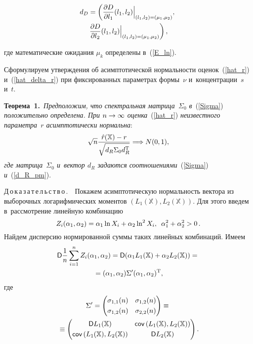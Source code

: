 \begin{multicols}{2}
\vspace*{-12pt}

\noindent
\begin{multline}
d_{D}=\left(\displaystyle\frac{\displaystyle \partial D\mathstrut}{\displaystyle \partial 
l_1\mathstrut}(l_1,l_2)\Big|_{(l_1,l_2)=(\mu_1,\mu_2)},\right.\\
\left.\displaystyle\frac{\displaystyle \partial D\mathstrut}{\displaystyle \partial l_2\mathstrut}(l_1,l_2)\Big|_{(l_1,l_2)=(\mu_1,\mu_2)}\right),
\label{d_D_pm}
\end{multline}

\columnbreak

\noindent
где математические ожидания $\mu_k$ определены\linebreak
 в~(\ref{E_ln}).

Сформулируем утверждения об асимптотической нор\-маль\-ности оценок~(\ref{hat_r}) и~(\ref{hat_delta_r})
 при фиксированных па\-ра\-мет\-рах формы~$\nu$ и~кон\-цент\-ра\-ции~$s$ и~$t$.

\smallskip

\noindent
\textbf{Теорема~1.}\
\textit{Предположим, что спект\-раль\-ная мат\-ри\-ца~$\Sigma_0$ в}~(\ref{Sigma}) \textit{положительно 
определена. При $n\hm\to\infty$ оцен\-ка}~(\ref{hat_r}) \textit{неизвестного па\-ра\-мет\-ра~$r$ 
асимп\-то\-ти\-чески нормальна}:
$$
\sqrt{n}\displaystyle\frac{\displaystyle {\hat r}(\mathbb{X})-r\mathstrut}{\displaystyle \sqrt{
d_{R}\Sigma_0 d_{R}^{\mathrm{T}}}\mathstrut}\Longrightarrow N(0,1),
$$
\textit{где мат\-ри\-ца~$\Sigma_0$ и~вектор $d_R$ задаются соотношениями}~(\ref{Sigma}) \textit{и}~(\ref{d_R_pm}).

\smallskip

\noindent
Д\,о\,к\,а\,з\,а\,т\,е\,л\,ь\,с\,т\,в\,о\,.\ \
Покажем асимптотическую нор\-маль\-ность вектора из выборочных логарифмических 
моментов $(L_1(\mathbb{X}), L_2(\mathbb{X}))$. Для этого введем в~рас\-смот\-ре\-ние 
линейную комбинацию 
$$Z_i(\alpha_1,\alpha_2)\hm=\alpha_1\ln X_i\hm+\alpha_2\ln^2 X_i,\enskip
\alpha_1^2\hm+\alpha_2^2\hm>0\,.$$
 Найдем дис\-пер\-сию нормированной суммы таких линейных 
комбинаций. \mbox{Имеем}
\begin{multline*}
{\sf D}\displaystyle\frac{\displaystyle 1\mathstrut}{\displaystyle n\mathstrut}\sum\limits_{i=1}^nZ_i(\alpha_1,\alpha_2)=
{\sf D}(\alpha_1L_1(\mathbb{X})+\alpha_2L_2(\mathbb{X}))={}\\
{}=
(\alpha_1,\alpha_2)\Sigma'(\alpha_1,\alpha_2)^{\mathrm{T}},
\end{multline*}
где
\begin{multline*}
\label{Sigma_bis}
\Sigma' =\begin{pmatrix}
\sigma_{1,1}(n)
&
\sigma_{1,2}(n)
\\[3pt]
\sigma_{1,2}(n)
&
\sigma_{2,2}(n)
\end{pmatrix}
\equiv{}\\
{}\equiv
\begin{pmatrix}
{\sf D} L_1(\mathbb{X})
&
{\sf cov}\left(L_1(\mathbb{X}),L_2(\mathbb{X})\right)
\\[3pt]
{\sf cov}\left(L_1(\mathbb{X}),L_2(\mathbb{X})\right)
&
{\sf D} L_2(\mathbb{X})
\end{pmatrix}.
\end{multline*}


\end{multicols}
